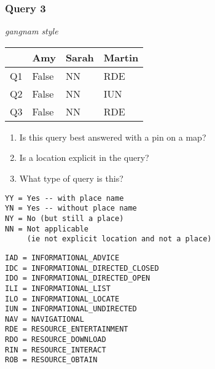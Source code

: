 \begin{frame}[fragile]
\frametitle{Query 3}
\vspace{1em}

\emph{gangnam style}

\vfill

\begin{table}
  \centering
  \begin{tabular}{ l l l l }
    & \textbf{Amy} & \textbf{Sarah} & \textbf{Martin}\\
    \toprule
    Q1 & False & NN & RDE\\
Q2 & False & NN & IUN\\
Q3 & False & NN & RDE\\
    \bottomrule
  \end{tabular}
\end{table}

\vfill

\tiny{

\begin{enumerate}
\item Is this query best answered with a pin on a map?
\item Is a location explicit in the query?
\item What type of query is this?
\end{enumerate}

\vfill

\begin{multicols}{2}
\begin{verbatim}
YY = Yes -- with place name
YN = Yes -- without place name
NY = No (but still a place)
NN = Not applicable 
     (ie not explicit location and not a place)
\end{verbatim}

\columnbreak
\begin{verbatim}
IAD = INFORMATIONAL_ADVICE
IDC = INFORMATIONAL_DIRECTED_CLOSED
IDO = INFORMATIONAL_DIRECTED_OPEN
ILI = INFORMATIONAL_LIST
ILO = INFORMATIONAL_LOCATE
IUN = INFORMATIONAL_UNDIRECTED
NAV = NAVIGATIONAL
RDE = RESOURCE_ENTERTAINMENT
RDO = RESOURCE_DOWNLOAD
RIN = RESOURCE_INTERACT
ROB = RESOURCE_OBTAIN
\end{verbatim}
\end{multicols}
}

\end{frame}


